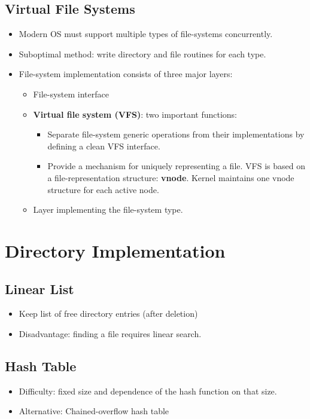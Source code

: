 \documentclass[10pt]{report}
\begin{document}
		\subsection{Virtual File Systems}
			\begin{itemize}
				\item Modern OS must support multiple types of file-systems concurrently.
				\item Suboptimal method: write directory and file routines for each type.
				\item File-system implementation consists of three major layers:
				\begin{itemize}
					\item File-system interface
					\item \textbf{Virtual file system (VFS)}: two important functions:
					\begin{itemize}
						\item Separate file-system generic operations from their implementations by defining a clean VFS interface.
						\item Provide a mechanism for uniquely representing a file. VFS is based on a file-representation structure: \textbf{vnode}. Kernel maintains one vnode structure for each active node.
					\end{itemize}
					\item Layer implementing the file-system type.
				\end{itemize}
			\end{itemize}

	\section{Directory Implementation}
		\subsection{Linear List}
			\begin{itemize}
				\item Keep list of free directory entries (after deletion)
				\item Disadvantage: finding a file requires linear search.
			\end{itemize}

		\subsection{Hash Table}
			\begin{itemize}
				\item Difficulty: fixed size and dependence of the hash function on that size.
				\item Alternative: Chained-overflow hash table
			\end{itemize}
\end{document}
